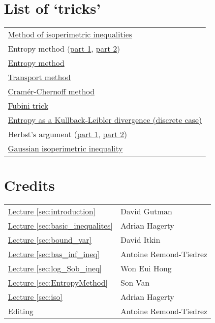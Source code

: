 \documentclass[reqno]{amsproc}
\newcommand{\fref}[2]{\hyperref[#2]{#1 \ref*{#2}}}
\begin{document}
\section*{List of `tricks'}
	\begin{tabular}{l}
		\hyperref[sec:method_of_isoperimetric_inequalities]{Method of isoperimetric inequalities}\\
		Entropy method (\hyperref[sec:entropy_method]{part 1}, \hyperref[rmk:entropy_method]{part 2})\\
		\hyperref[sec:entropy_method]{Entropy method}\\
		\hyperref[sec:transport_method]{Transport method}\\
		\hyperref[rmk:cramer_chernoff]{Cram\'{e}r-Chernoff method}\\
		\hyperref[rmk:Fubini]{Fubini trick}\\
		\hyperref[rmk:entropy_as_KL_divergence]{Entropy as a Kullback-Leibler divergence (discrete case)}\\
		Herbst's argument (\hyperref[rmk:herbst_1]{part 1}, \hyperref[rmk:herbst_2]{part 2})\\
		\hyperref[rmk:iso]{Gaussian isoperimetric inequality}
	\end{tabular}
\section*{Credits}
	\begin{tabular}{ll}
		\fref{Lecture}{sec:introduction}& David Gutman\\
		\fref{Lecture}{sec:basic_inequalites}& Adrian Hagerty\\
		\fref{Lecture}{sec:bound_var}& David Itkin\\
		\fref{Lecture}{sec:bas_inf_ineq}& Antoine Remond-Tiedrez\\
		\fref{Lecture}{sec:log_Sob_ineq}& Won Eui Hong \\
		\fref{Lecture}{sec:EntropyMethod}& Son Van \\
		\fref{Lecture}{sec:iso}& Adrian Hagerty \\
		Editing& Antoine Remond-Tiedrez
	\end{tabular}



\end{document}
